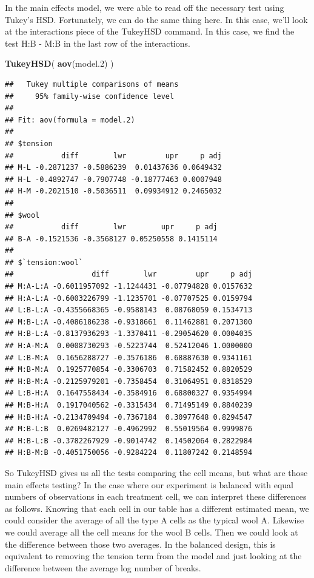 \documentclass[]{book}
\newenvironment{Shaded}{\begin{snugshade}}{\end{snugshade}}
\newcommand{\KeywordTok}[1]{\textcolor[rgb]{0.13,0.29,0.53}{\textbf{{#1}}}}
\newcommand{\FloatTok}[1]{\textcolor[rgb]{0.00,0.00,0.81}{{#1}}}
\newcommand{\NormalTok}[1]{{#1}}
\theoremstyle{definition}
\theoremstyle{definition}
\theoremstyle{remark}
\begin{document}
In the main effects model, we were able to read off the necessary test
using Tukey's HSD. Fortunately, we can do the same thing here. In this
case, we'll look at the interactions piece of the TukeyHSD command. In
this case, we find the test H:B - M:B in the last row of the
interactions.

\begin{Shaded}
\begin{Highlighting}[]
\KeywordTok{TukeyHSD}\NormalTok{( }\KeywordTok{aov}\NormalTok{(model}\FloatTok{.2}\NormalTok{) )}
\end{Highlighting}
\end{Shaded}

\begin{verbatim}
##   Tukey multiple comparisons of means
##     95% family-wise confidence level
## 
## Fit: aov(formula = model.2)
## 
## $tension
##           diff        lwr         upr     p adj
## M-L -0.2871237 -0.5886239  0.01437636 0.0649432
## H-L -0.4892747 -0.7907748 -0.18777463 0.0007948
## H-M -0.2021510 -0.5036511  0.09934912 0.2465032
## 
## $wool
##           diff        lwr        upr     p adj
## B-A -0.1521536 -0.3568127 0.05250558 0.1415114
## 
## $`tension:wool`
##                  diff        lwr         upr     p adj
## M:A-L:A -0.6011957092 -1.1244431 -0.07794828 0.0157632
## H:A-L:A -0.6003226799 -1.1235701 -0.07707525 0.0159794
## L:B-L:A -0.4355668365 -0.9588143  0.08768059 0.1534713
## M:B-L:A -0.4086186238 -0.9318661  0.11462881 0.2071300
## H:B-L:A -0.8137936293 -1.3370411 -0.29054620 0.0004035
## H:A-M:A  0.0008730293 -0.5223744  0.52412046 1.0000000
## L:B-M:A  0.1656288727 -0.3576186  0.68887630 0.9341161
## M:B-M:A  0.1925770854 -0.3306703  0.71582452 0.8820529
## H:B-M:A -0.2125979201 -0.7358454  0.31064951 0.8318529
## L:B-H:A  0.1647558434 -0.3584916  0.68800327 0.9354994
## M:B-H:A  0.1917040562 -0.3315434  0.71495149 0.8840239
## H:B-H:A -0.2134709494 -0.7367184  0.30977648 0.8294547
## M:B-L:B  0.0269482127 -0.4962992  0.55019564 0.9999876
## H:B-L:B -0.3782267929 -0.9014742  0.14502064 0.2822984
## H:B-M:B -0.4051750056 -0.9284224  0.11807242 0.2148594
\end{verbatim}

So TukeyHSD gives us all the tests comparing the cell means, but what
are those main effects testing? In the case where our experiment is
balanced with equal numbers of observations in each treatment cell, we
can interpret these differences as follows. Knowing that each cell in
our table has a different estimated mean, we could consider the average
of all the type A cells as the typical wool A. Likewise we could average
all the cell means for the wool B cells. Then we could look at the
difference between those two averages. In the balanced design, this is
equivalent to removing the tension term from the model and just looking
at the difference between the average log number of breaks.
\end{document}

